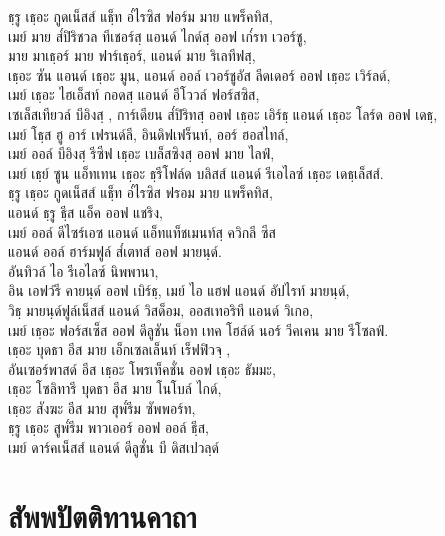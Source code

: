 ธฺรู เธฺอะ กูดเน็สส์ แธฺ็ท อ๎ไรซิส ฟอร์ม มาย แพร็คทิส,\\
เมย์ มาย ส๎ปิริชวล ทีเชอร์สฺ แอนด์ ไกด์สฺ ออฟ เก๎รท เวอร์ชู,\\
มาย มาเธฺอร์ มาย ฟาร์เธฺอร์, แอนด์ มาย ริเลทีฟสฺ,\\
เธฺอะ ซัน แอนด์ เธฺอะ มูน, แอนด์ ออล์ เวอร์ชูอัส ลีดเดอร์ ออฟ เธฺอะ เวิร์ลด์,\\
เมย์ เธฺอะ ไฮเอ็สท์ กอดสฺ  แอนด์ อีโววล์ ฟอร์สซิส,\\
เซเล็สเทียวล์ บีอิงสฺ , การ์เดียน ส๎ปิริทสฺ  ออฟ เธฺอะ เอิร์ธฺ แอนด์ เธฺอะ โลร์ด ออฟ เดธฺ,\\
เมย์ โธฺส ฮู อาร์ เฟรนด์ลี, อินดิฟเฟร็นท์, ออร์ ฮอสไทล์,\\
เมย์ ออล์ บีอิงสฺ  รีซีฟ เธฺอะ เบล็สซิงสฺ  ออฟ มาย ไลฟ์,\\
เมย์ เธฺย์ ซูน แอ็ทเทน เธฺอะ ธฺรีโฟล์ด บลิสส์ แอนด์ รีเอไลซ์ เธฺอะ เดธฺเล็สส์.\\
ธฺรู เธฺอะ กูดเน็สส์ แธฺ็ท อ๎ไรซิส ฟรอม มาย แพร็คทิส,\\
แอนด์ ธฺรู ธฺีส แอ็ค ออฟ แชริง,\\
เมย์ ออล์ ดีไซร์เอซ แอนด์ แอ็ทแท็ชเมนท์สฺ ควิกลี ซีส\\
แอนด์ ออล์ ฮาร์มฟูล์ ส๎เตทส์ ออฟ มายนฺด์.\\
อันทิวล์ ไอ รีเอไลซ์ นิพพานา,\\
อิน เอฟว์รี คายนฺด์ ออฟ เบิร์ธฺ, เมย์ ไอ แฮฟ แอนด์ อัปไรท์ มายนฺด์,\\
วิธฺ มายนฺด์ฟูล์เน็สส์ แอนด์ วิสด็อม, ออสเทอริที แอนด์ วิเกอ,\\
เมย์ เธฺอะ ฟอร์สเซ็ส ออฟ ดีลูชัน น็อท เทค โฮล์ด์ นอร์ วีคเคน มาย รีโซลฟ์.\\
เธฺอะ บุดธา อีส มาย เอ็กเซลเล็นท์ เร็ฟฟิวจฺ ,\\
อันเซอร์พาสด์ อีส เธฺอะ โพรเท็คชั่น ออฟ เธฺอะ ธัมมะ,\\
เธฺอะ โซลิทารี บุดธา อีส มาย โนโบล์ ไกด์,\\
เธฺอะ สังฆะ อีส มาย สุพ๎รีม ซัพพอร์ท,\\
ธฺรู เธฺอะ สูพ๎รีม พาวเออร์ ออฟ ออล์ ธฺีส,\\
เมย์ ดาร์คเน็สส์ แอนด์ ดีลูชั่น บี ดิสเปวลฺด์\\
\clearpage

\chapter{สัพพปัตติทานคาถา}

\begin{leader}
\end{leader}

